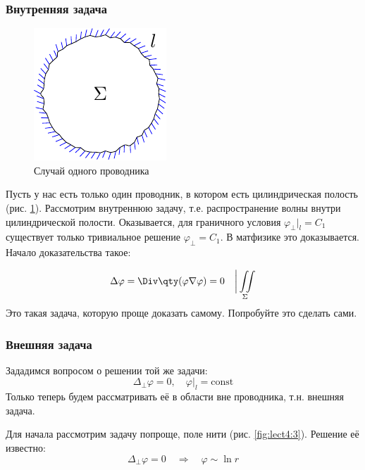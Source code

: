 \subsubsection{Внутренняя задача}
\begin{figure}[H]
	\centering
	\includegraphics[scale=1.5]{img/lect4_ris2}
	\caption{Случай одного проводника}
	\label{fig:lect4:2}
\end{figure}
Пусть у нас есть только один проводник, в котором есть цилиндрическая полость (рис. \ref{fig:lect4:2}). Рассмотрим внутреннюю задачу, т.е. распространение волны внутри цилиндрической полости. Оказывается, для граничного условия $\varphi_\perp|_l=C_1$ существует только тривиальное решение $\varphi_\perp=C_1$. В матфизике это доказывается. Начало доказательства такое:

\begin{equation}
	\Delta \varphi=\Div\qty(\varphi\nabla \varphi)=0 \quad \bigg| \iint\limits_\Sigma
\end{equation}
Это такая задача, которую проще доказать самому. Попробуйте это сделать сами.

\subsubsection{Внешняя задача}
Зададимся вопросом о решении той же задачи:
\begin{equation}
	\Delta_\perp \varphi=0, \quad \varphi|_l=\mathrm{const}
\end{equation}
Только теперь будем рассматривать её в области вне проводника, т.н. внешняя задача.

Для начала рассмотрим задачу попроще, поле нити (рис. \ref{fig:lect4:3}). Решение её известно:
\begin{equation}
 	\Delta_\perp \varphi=0 
 		\quad \Rightarrow \quad
 	\varphi \sim \ln r
\end{equation} 

